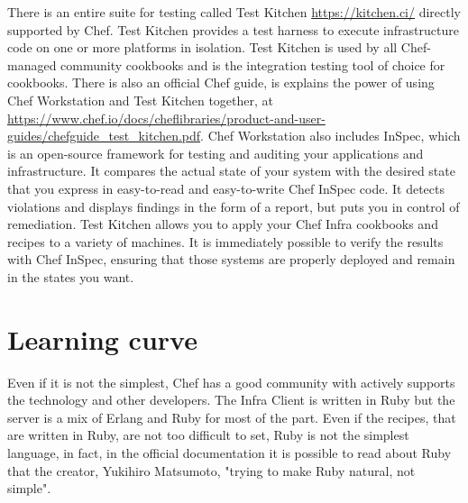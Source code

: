 \documentclass[12pt,a4paper,openright,twoside]{book}
\begin{document}
There is an entire suite for testing called Test Kitchen \url{https://kitchen.ci/} directly supported by Chef.
Test Kitchen provides a test harness to execute infrastructure code on one or more platforms in isolation.\cite{chefTestKit}
Test Kitchen is used by all Chef-managed community cookbooks and is the integration testing tool of choice for cookbooks.\cite{chefTestKit}
There is also an official Chef guide, is explains the power of using Chef Workstation and Test Kitchen together, at \url{https://www.chef.io/docs/cheflibraries/product-and-user-guides/chefguide_test_kitchen.pdf}.
Chef Workstation also includes InSpec, which is an open-source framework for testing and auditing your applications and infrastructure. It compares the actual state of your system with the desired state that you express in easy-to-read and easy-to-write Chef InSpec code. It detects violations and displays findings in the form of a report, but puts you in control of remediation.\cite{chefInSpec}
Test Kitchen allows you to apply your Chef Infra cookbooks and recipes to a variety of machines. It is immediately possible to verify the results with Chef InSpec, ensuring that those systems are properly deployed and remain in the states you want.\cite{chefTestKitPdf}


\section{Learning curve}
Even if it is not the simplest, Chef has a good community with actively supports the technology and other developers.
The Infra Client is written in Ruby but the server is a mix of Erlang and Ruby for most of the part.
Even if the recipes, that are written in Ruby, are not too difficult to set, Ruby is not the simplest language, in fact, in the official documentation it is possible to read about Ruby that the creator, Yukihiro Matsumoto,
"trying to make Ruby natural, not simple"\cite{rubyDoc}.

\end{document}
